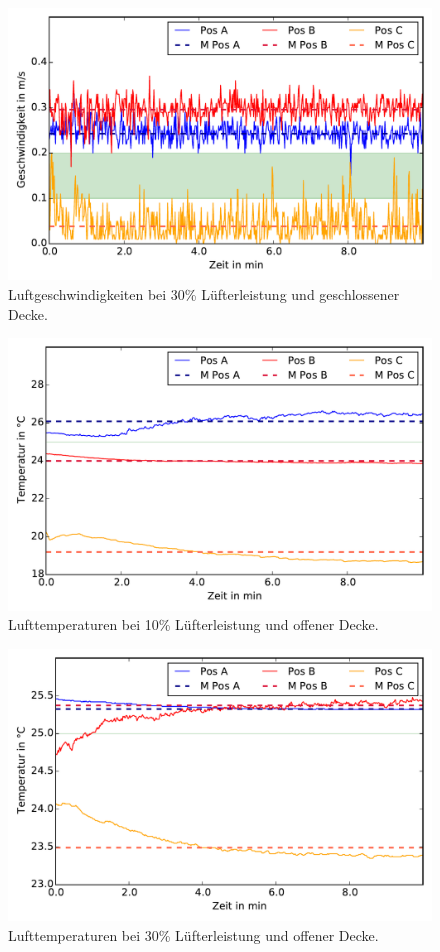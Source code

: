 \begin{figure}[h!tb]
\centering
\includegraphics[scale=.8]{Pictures/AV30pctCC.pdf}
\caption{Luftgeschwindigkeiten bei 30\% Lüfterleistung und geschlossener Decke.}
\label{fig:30pctCC}
\end{figure}

\begin{figure}[h!tb]
\centering
\includegraphics[scale=.8]{Pictures/AT10pctOC.pdf}
\caption{Lufttemperaturen bei 10\% Lüfterleistung und offener Decke.}
\label{fig:10pctOC_temp}
\end{figure}


\begin{figure}[h!tb]
\centering
\includegraphics[scale=.8]{Pictures/AT30pctOC.pdf}
\caption{Lufttemperaturen bei 30\% Lüfterleistung und offener Decke.}
\label{fig:30pctOC_temp}
\end{figure}

